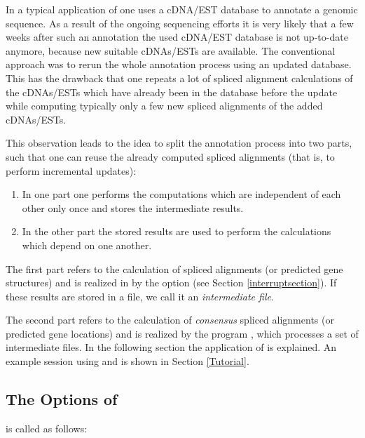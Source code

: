 \documentclass[11pt,a4paper,titlepage]{article}
\begin{document}
In a typical application of \Callgth one uses a cDNA/EST database to annotate
a genomic sequence. As a result of the ongoing sequencing efforts it is very
likely that a few weeks after such an annotation the used cDNA/EST database is 
not up-to-date anymore, because new suitable cDNAs/ESTs are available. 
The conventional approach was to rerun the whole annotation
process using an updated database.
This has the drawback that one repeats a lot of spliced alignment
calculations of the cDNAs/ESTs which have already been in the database
before the update while computing typically only a few new spliced
alignments of the added cDNAs/ESTs.

This observation leads to the idea to split the annotation process into two
parts, such that one can reuse the already computed spliced alignments (that is, to
perform incremental updates):


\begin{enumerate}
\item In one part one performs the computations which are independent of each
other only once and stores the intermediate results. 
\item In the other part the stored results are used to perform the calculations
 which depend on one another.
\end{enumerate}

The first part refers to the calculation of spliced alignments (or  predicted gene structures) and is realized
in \Callgth by the option  (see Section \ref{interruptsection}). If these results are stored in a file, we call it an  \emph{intermediate file}.

The second part refers to the calculation of  \textit{consensus} spliced alignments (or  predicted gene locations) and is realized by the program
\Callgthconsensus, which processes a set of intermediate files. In the
following section the application of \Callgthconsensus is explained.  An
example session using \Callgth {} and \Callgthconsensus
is shown in Section \ref{Tutorial}.

\subsection{The Options of \Callgthconsensus}

\Callgthconsensus is called as follows:
\end{document}
